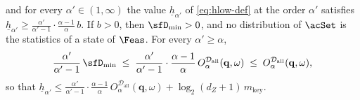 \begin{proposition}
\begin{enumerate}[label=(\roman*),leftmargin=2.2em]
  and for every $\alpha'\in(1,\infty)$ the value $\underline{h}_{\alpha'}$
  of \eqref{eq:hlow-def} at the order $\alpha'$ satisfies
  $\underline{h}_{\alpha'}\ge\frac{\alpha'}{\alpha'-1}\cdot
  \frac{\alpha-1}{\alpha}\,b$. If $b>0$, then $\sfD_{\min}>0$, and no
  distribution of $\acSet$ is the statistics of a state of $\Feas$.
  For every $\alpha'\ge\alpha$,
  \begin{equation}\label{eq:dmin-ceiling}
    \frac{\alpha'}{\alpha'-1}\,\sfD_{\min}\;\le\;
    \frac{\alpha'}{\alpha'-1}\cdot\frac{\alpha-1}{\alpha}\,
    O^{\mathcal{D}_{\mathrm{all}}}_{\alpha}(\mathbf q,\omega)\;\le\;
    O^{\mathcal{D}_{\mathrm{all}}}_{\alpha}(\mathbf q,\omega),
  \end{equation}
  so that $\underline{h}_{\alpha'}\le
  \frac{\alpha'}{\alpha'-1}\cdot\frac{\alpha-1}{\alpha}\,
  O^{\mathcal{D}_{\mathrm{all}}}_{\alpha}(\mathbf q,\omega)
  +\log_2(d_Z+1)\,m_{\mathrm{key}}$.
\end{enumerate}
\end{proposition}

